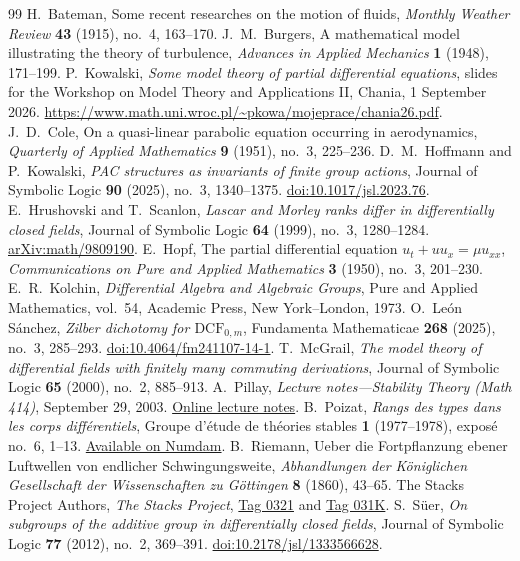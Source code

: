 \documentclass[10pt,a4paper]{amsart}
\begin{document}
\begin{thebibliography}{99}
 H.~Bateman, Some recent researches on the motion of fluids, \emph{Monthly Weather Review} \textbf{43} (1915), no.~4, 163--170.
 J.~M.~Burgers, A mathematical model illustrating the theory of turbulence, \emph{Advances in Applied Mechanics} \textbf{1} (1948), 171--199.
 P.~Kowalski, \emph{Some model theory of partial differential equations}, slides for the Workshop on Model Theory and Applications II, Chania, 1 September 2026. \url{https://www.math.uni.wroc.pl/~pkowa/mojeprace/chania26.pdf}.
 J.~D.~Cole, On a quasi-linear parabolic equation occurring in aerodynamics, \emph{Quarterly of Applied Mathematics} \textbf{9} (1951), no.~3, 225--236.
 D.~M.~Hoffmann and P.~Kowalski, \emph{PAC structures as invariants of finite group actions}, Journal of Symbolic Logic \textbf{90} (2025), no.~3, 1340--1375. \href{https://doi.org/10.1017/jsl.2023.76} {doi:10.1017/jsl.2023.76}.
 E.~Hrushovski and T.~Scanlon, \emph{Lascar and Morley ranks differ in differentially closed fields}, Journal of Symbolic Logic \textbf{64} (1999), no.~3, 1280--1284. \href{https://arxiv.org/abs/math/9809190}{arXiv:math/9809190}.
 E.~Hopf, The partial differential equation $u_t+uu_x=\mu u_{xx}$, \emph{Communications on Pure and Applied Mathematics} \textbf{3} (1950), no.~3, 201--230.
 E.~R.~Kolchin, \emph{Differential Algebra and Algebraic Groups}, Pure and Applied Mathematics, vol.~54, Academic Press, New York--London, 1973.
 O.~Le\'on S\'anchez, \emph{Zilber dichotomy for $\mathrm{DCF}_{0,m}$}, Fundamenta Mathematicae \textbf{268} (2025), no.~3, 285--293. \href{https://doi.org/10.4064/fm241107-14-1} {doi:10.4064/fm241107-14-1}.
 T.~McGrail, \emph{The model theory of differential fields with finitely many commuting derivations}, Journal of Symbolic Logic \textbf{65} (2000), no.~2, 885--913.
 A.~Pillay, \emph{Lecture notes---Stability Theory (Math 414)}, September 29, 2003. \href{https://academicweb.nd.edu/~apillay/pdf/lecturenotes.stability.pdf} {Online lecture notes}.
 B.~Poizat, \emph{Rangs des types dans les corps diff\'erentiels}, Groupe d'\'etude de th\'eories stables \textbf{1} (1977--1978), expos\'e no.~6, 1--13. \href{https://www.numdam.org/item/STS_1977-1978__1__A6_0/} {Available on Numdam}.
 B.~Riemann, Ueber die Fortpflanzung ebener Luftwellen von endlicher Schwingungsweite, \emph{Abhandlungen der K\"oniglichen Gesellschaft der Wissenschaften zu G\"ottingen} \textbf{8} (1860), 43--65.
 The Stacks Project Authors, \emph{The Stacks Project}, \href{https://stacks.math.columbia.edu/tag/0321}{Tag 0321} and \href{https://stacks.math.columbia.edu/tag/031K}{Tag 031K}.
 S.~S\"uer, \emph{On subgroups of the additive group in differentially closed fields}, Journal of Symbolic Logic \textbf{77} (2012), no.~2, 369--391. \href{https://doi.org/10.2178/jsl/1333566628} {doi:10.2178/jsl/1333566628}.
\end{thebibliography}
\end{document}
